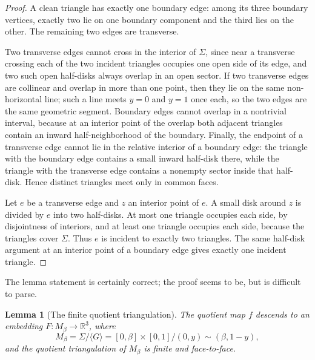 \documentclass[12pt]{article}
\newcommand{\R}{\mathbb R}
\theoremstyle{plain}
\newtheorem{lemma}[theorem]{Lemma}
\newcommand{\review}[1]{\begin{reviewbox}#1\end{reviewbox}}
\begin{document}
\begin{proof}
A clean triangle has exactly one boundary edge: among its three boundary
vertices, exactly two lie on one boundary component and the third lies on the
other.  The remaining two edges are transverse.

Two transverse edges cannot cross in the interior of \(\Sigma\), since near a
transverse crossing each of the two incident triangles occupies one open side
of its edge, and two such open half-disks always overlap in an open sector.  If
two transverse edges are collinear and overlap in more than one point, then
they lie on the same non-horizontal line; such a line meets \(y=0\) and
\(y=1\) once each, so the two edges are the same geometric segment.  Boundary
edges cannot overlap in a nontrivial interval, because at an interior point of
the overlap both adjacent triangles contain an inward half-neighborhood of the
boundary.  Finally, the endpoint of a transverse edge cannot lie in the
relative interior of a boundary edge: the triangle with the boundary edge
contains a small inward half-disk there, while the triangle with the transverse
edge contains a nonempty sector inside that half-disk.  Hence distinct
triangles meet only in common faces.

Let \(e\) be a transverse edge and \(z\) an interior point of \(e\).  A small
disk around \(z\) is divided by \(e\) into two half-disks.  At most one
triangle occupies each side, by disjointness of interiors, and at least one
triangle occupies each side, because the triangles cover \(\Sigma\).  Thus
\(e\) is incident to exactly two triangles.  The same half-disk argument at an
interior point of a boundary edge gives exactly one incident triangle.
\end{proof}

\review{The lemma statement is certainly correct; the proof seems to be, but is difficult to parse.}

\begin{lemma}[The finite quotient triangulation]\label{lem:quotient}
The quotient map \(f\) descends to an embedding
\(F:M_\beta\to\R^3\), where
\[
M_\beta=\Sigma/\langle G\rangle
      =[0,\beta]\times[0,1]/(0,y)\sim(\beta,1-y),
\]
and the quotient triangulation of \(M_\beta\) is finite and face-to-face.
\end{lemma}
\end{document}
